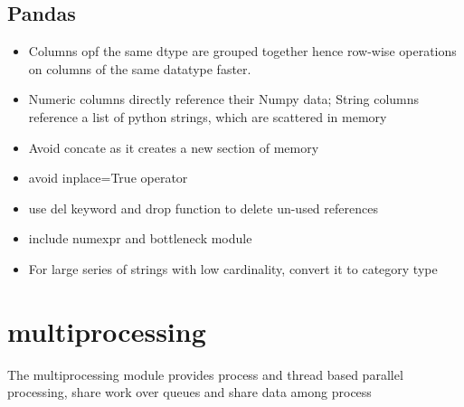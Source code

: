\documentclass{article}
\begin{document}
	\subsection{Pandas}
		\begin{itemize}
			\item Columns opf the same dtype are grouped together hence row-wise operations on columns of the same datatype faster.
			\item Numeric columns directly reference their Numpy data; String columns reference a list of python strings, which are scattered in memory
			\item Avoid concate as it creates a new section of memory
			\item avoid inplace=True operator
			\item use del keyword and drop function to delete un-used references
			\item include numexpr and bottleneck module
			\item For large series of strings with low cardinality, convert it to category type
		\end{itemize}

\section{multiprocessing}
	The multiprocessing module provides process and thread based parallel processing, share work over queues and share data among process
	
\end{document}
